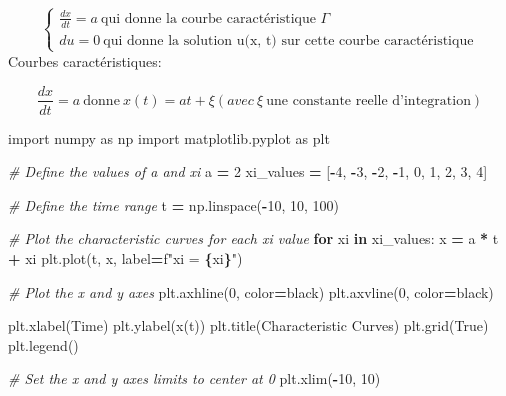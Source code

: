\documentclass[
]{article}
\newenvironment{Shaded}{\begin{snugshade}}{\end{snugshade}}
\newcommand{\CommentTok}[1]{\textcolor[rgb]{0.56,0.35,0.01}{\textit{#1}}}
\newcommand{\ControlFlowTok}[1]{\textcolor[rgb]{0.13,0.29,0.53}{\textbf{#1}}}
\newcommand{\DecValTok}[1]{\textcolor[rgb]{0.00,0.00,0.81}{#1}}
\newcommand{\ImportTok}[1]{#1}
\newcommand{\KeywordTok}[1]{\textcolor[rgb]{0.13,0.29,0.53}{\textbf{#1}}}
\newcommand{\NormalTok}[1]{#1}
\newcommand{\OperatorTok}[1]{\textcolor[rgb]{0.81,0.36,0.00}{\textbf{#1}}}
\newcommand{\SpecialCharTok}[1]{\textcolor[rgb]{0.81,0.36,0.00}{\textbf{#1}}}
\newcommand{\SpecialStringTok}[1]{\textcolor[rgb]{0.31,0.60,0.02}{#1}}
\newcommand{\StringTok}[1]{\textcolor[rgb]{0.31,0.60,0.02}{#1}}
\newcommand{\VariableTok}[1]{\textcolor[rgb]{0.00,0.00,0.00}{#1}}
\begin{document}
\[
\left\{
\begin{array}{ll}
\frac{dx}{dt} = a \ \text{qui donne la courbe caractéristique }\Gamma\\
du = 0 \ \text{qui donne la solution u(x, t) sur cette courbe caractéristique} 
\end{array}
\right.
\] Courbes caractéristiques:

\[
\frac{dx}{dt} = a \ \text{donne} \ x(t) = at + \xi (avec \ \xi \ \text{une constante reelle d'integration})
\]

\begin{Shaded}
\begin{Highlighting}[]
\ImportTok{import}\NormalTok{ numpy }\ImportTok{as}\NormalTok{ np}
\ImportTok{import}\NormalTok{ matplotlib.pyplot }\ImportTok{as}\NormalTok{ plt}

\CommentTok{\# Define the values of a and xi}
\NormalTok{a }\OperatorTok{=} \DecValTok{2}
\NormalTok{xi\_values }\OperatorTok{=}\NormalTok{ [}\OperatorTok{{-}}\DecValTok{4}\NormalTok{, }\OperatorTok{{-}}\DecValTok{3}\NormalTok{, }\OperatorTok{{-}}\DecValTok{2}\NormalTok{, }\OperatorTok{{-}}\DecValTok{1}\NormalTok{, }\DecValTok{0}\NormalTok{, }\DecValTok{1}\NormalTok{, }\DecValTok{2}\NormalTok{, }\DecValTok{3}\NormalTok{, }\DecValTok{4}\NormalTok{]}

\CommentTok{\# Define the time range}
\NormalTok{t }\OperatorTok{=}\NormalTok{ np.linspace(}\OperatorTok{{-}}\DecValTok{10}\NormalTok{, }\DecValTok{10}\NormalTok{, }\DecValTok{100}\NormalTok{)}

\CommentTok{\# Plot the characteristic curves for each xi value}
\ControlFlowTok{for}\NormalTok{ xi }\KeywordTok{in}\NormalTok{ xi\_values:}
\NormalTok{    x }\OperatorTok{=}\NormalTok{ a }\OperatorTok{*}\NormalTok{ t }\OperatorTok{+}\NormalTok{ xi}
\NormalTok{    plt.plot(t, x, label}\OperatorTok{=}\SpecialStringTok{f"xi = }\SpecialCharTok{\{}\NormalTok{xi}\SpecialCharTok{\}}\SpecialStringTok{"}\NormalTok{)}

\CommentTok{\# Plot the x and y axes}
\NormalTok{plt.axhline(}\DecValTok{0}\NormalTok{, color}\OperatorTok{=}\StringTok{\textquotesingle{}black\textquotesingle{}}\NormalTok{)}
\NormalTok{plt.axvline(}\DecValTok{0}\NormalTok{, color}\OperatorTok{=}\StringTok{\textquotesingle{}black\textquotesingle{}}\NormalTok{)}

\NormalTok{plt.xlabel(}\StringTok{\textquotesingle{}Time\textquotesingle{}}\NormalTok{)}
\NormalTok{plt.ylabel(}\StringTok{\textquotesingle{}x(t)\textquotesingle{}}\NormalTok{)}
\NormalTok{plt.title(}\StringTok{\textquotesingle{}Characteristic Curves\textquotesingle{}}\NormalTok{)}
\NormalTok{plt.grid(}\VariableTok{True}\NormalTok{)}
\NormalTok{plt.legend()}

\CommentTok{\# Set the x and y axes limits to center at 0}
\NormalTok{plt.xlim(}\OperatorTok{{-}}\DecValTok{10}\NormalTok{, }\DecValTok{10}\NormalTok{)}
\end{Highlighting}
\end{Shaded}
\end{document}
